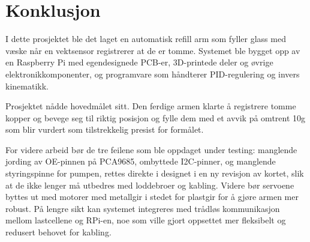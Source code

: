 \section{Konklusjon}
I dette prosjektet ble det laget en automatisk refill arm som fyller glass med væske når en vektsensor registrerer at de er tomme. Systemet ble bygget opp av en Raspberry Pi med egendesignede PCB-er, 3D-printede deler og øvrige elektronikkomponenter, og programvare som håndterer PID-regulering og invers kinematikk.

Prosjektet nådde hovedmålet sitt. Den ferdige armen klarte å registrere tomme kopper og bevege seg til riktig posisjon og fylle dem med et avvik på omtrent 10g som blir vurdert som tilstrekkelig presist for formålet. 

For videre arbeid bør de tre feilene som ble oppdaget under testing: manglende jording av OE-pinnen på PCA9685, ombyttede I2C-pinner, og manglende styringspinne for pumpen, rettes direkte i designet i en ny revisjon av kortet, slik at de ikke lenger må utbedres med loddebroer og kabling. Videre bør servoene byttes ut med motorer med metallgir i stedet for plastgir for å gjøre armen mer robust. På lengre sikt kan systemet integreres med trådløs kommunikasjon mellom lastcellene og RPi-en, noe som ville gjort oppsettet mer fleksibelt og redusert behovet for kabling.